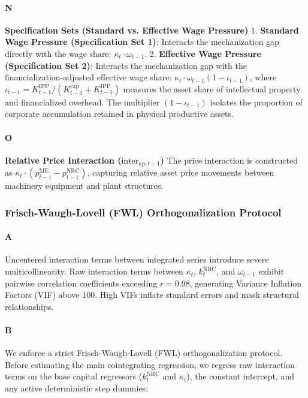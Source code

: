 \paragraph{N}
\textbf{Specification Sets (Standard vs. Effective Wage Pressure)}
1. \textbf{Standard Wage Pressure (Specification Set 1)}: Interacts the mechanization gap directly with the wage share: $\kappa_t \cdot \omega_{t-1}$.
2. \textbf{Effective Wage Pressure (Specification Set 2)}: Interacts the mechanization gap with the financialization-adjusted effective wage share: $\kappa_t \cdot \omega_{t-1}(1 - \iota_{t-1})$, where $\iota_{t-1} = K_{t-1}^{\text{IPP}} / (K_{t-1}^{\text{cap}} + K_{t-1}^{\text{IPP}})$ measures the asset share of intellectual property and financialized overhead. The multiplier $(1 - \iota_{t-1})$ isolates the proportion of corporate accumulation retained in physical productive assets.

\paragraph{O}
\textbf{Relative Price Interaction ($\text{inter}_{\kappa p, t-1}$)}
The price interaction is constructed as $\kappa_t \cdot (p_{t-1}^{\text{ME}} - p_{t-1}^{\text{NRC}})$, capturing relative asset price movements between machinery equipment and plant structures.

\subsubsection{Frisch-Waugh-Lovell (FWL) Orthogonalization Protocol}

\paragraph{A}
Uncentered interaction terms between integrated series introduce severe multicollinearity. Raw interaction terms between $\kappa_t$, $k_t^{\text{NRC}}$, and $\omega_{t-1}$ exhibit pairwise correlation coefficients exceeding $r = 0.98$, generating Variance Inflation Factors (VIF) above 100. High VIFs inflate standard errors and mask structural relationships.

\paragraph{B}
We enforce a strict Frisch-Waugh-Lovell (FWL) orthogonalization protocol. Before estimating the main cointegrating regression, we regress raw interaction terms on the base capital regressors ($k_t^{\text{NRC}}$ and $\kappa_t$), the constant intercept, and any active deterministic step dummies:

